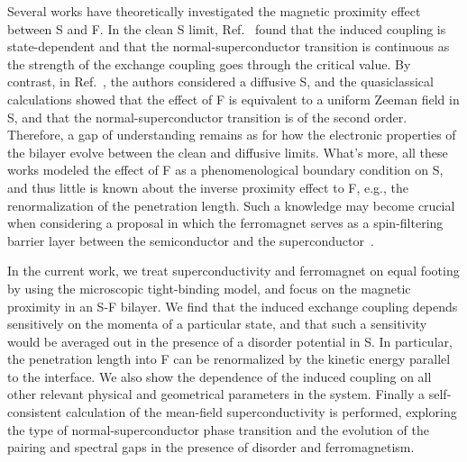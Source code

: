 \documentclass[aps,prl,twocolumn,superscriptaddress,showpacs,longbibliography]{revtex4-1}
\begin{document}
Several works have theoretically investigated the magnetic proximity effect between S and F.
In the clean S limit, Ref.~\cite{Langbehn2020Topological} found that the induced coupling is state-dependent and that the normal-superconductor transition is continuous as the strength of the exchange coupling goes through the critical value.
By contrast, in Ref.~\cite{Khindanov2020Topological}, the authors considered a diffusive S, and the quasiclassical calculations showed that the effect of F is equivalent to a uniform Zeeman field in S, and that the normal-superconductor transition is of the second order.
Therefore, a gap of understanding remains as for how the electronic properties of the bilayer evolve between the clean and diffusive limits.
What's more, all these works modeled the effect of F as a phenomenological boundary condition on S, and thus little is known about the inverse proximity effect to F, e.g., the renormalization of the penetration length.
Such a knowledge may become crucial when considering a proposal in which the ferromagnet serves as a spin-filtering barrier layer between the semiconductor and the superconductor~\cite{Maiani2021Topological}.



In the current work, we treat superconductivity and ferromagnet on equal footing by using the microscopic tight-binding model, and focus on the magnetic proximity in an S-F bilayer.
We find that the induced exchange coupling depends sensitively on the momenta of a particular state, and that such a sensitivity would be averaged out in the presence of a disorder potential in S.
In particular, the penetration length into F can be renormalized by the kinetic energy parallel to the interface.
We also show the dependence of the induced coupling on all other relevant physical and geometrical parameters in the system. 
Finally a self-consistent calculation of the mean-field superconductivity is performed, exploring the type of normal-superconductor phase transition and the evolution of the pairing and spectral gaps in the presence of disorder and ferromagnetism.
\end{document}
